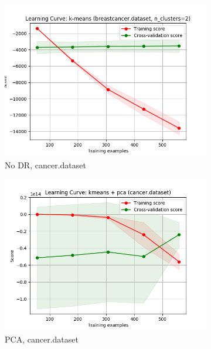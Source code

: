 \documentclass{article}
\begin{document}
    \begin{figure}[htb]
    \centering

      \begin{subfigure}{0.33\textwidth}
        \includegraphics[width=\linewidth]{out/kmeans/cancer-learning.png}
        \caption{No DR, cancer.dataset}
      \end{subfigure}\hfil
      \begin{subfigure}{0.33\textwidth}
        \includegraphics[width=\linewidth]{out/cluster_dr/cancer-kmeans-pca-learning.png}
        \caption{PCA, cancer.dataset}
      \end{subfigure}\hfil
      \begin{subfigure}{0.33\textwidth}

\end{subfigure}
\end{figure}
\end{document}
